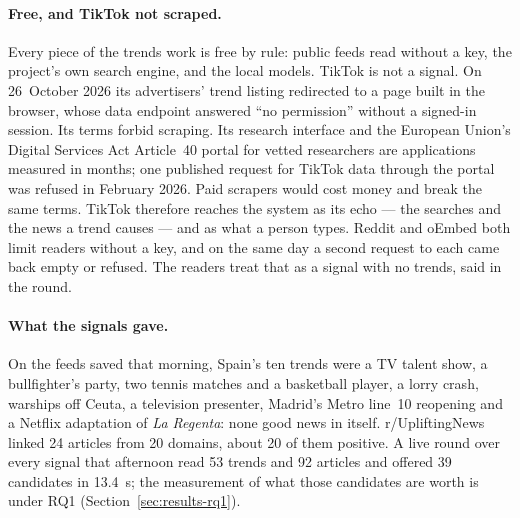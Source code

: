 \paragraph{Free, and TikTok not scraped.} Every piece of the trends work
is free by rule: public feeds read without a key, the project's own
search engine, and the local models. TikTok is not a signal. On
26~October 2026 its advertisers' trend listing redirected to a page built
in the browser, whose data endpoint answered ``no permission'' without a
signed-in session. Its terms forbid scraping. Its research interface and
the European Union's Digital Services Act Article~40 portal for vetted
researchers are applications measured in months; one published request
for TikTok data through the portal was refused in February 2026. Paid
scrapers would cost money and break the same terms. TikTok therefore
reaches the system as its echo --- the searches and the news a trend
causes --- and as what a person types. Reddit and oEmbed both limit
readers without a key, and on the same day a second request to each came
back empty or refused. The readers treat that as a signal with no trends,
said in the round.

\paragraph{What the signals gave.} On the feeds saved that morning,
Spain's ten trends were a TV talent show, a bullfighter's party, two
tennis matches and a basketball player, a lorry crash, warships off
Ceuta, a television presenter, Madrid's Metro line~10 reopening and a
Netflix adaptation of \emph{La Regenta}: none good news in itself.
r/UpliftingNews linked 24 articles from 20 domains, about 20 of them
positive. A live round over every signal that afternoon read 53 trends
and 92 articles and offered 39 candidates in 13.4~s; the measurement of
what those candidates are worth is under RQ1
(Section~\ref{sec:results-rq1}).
